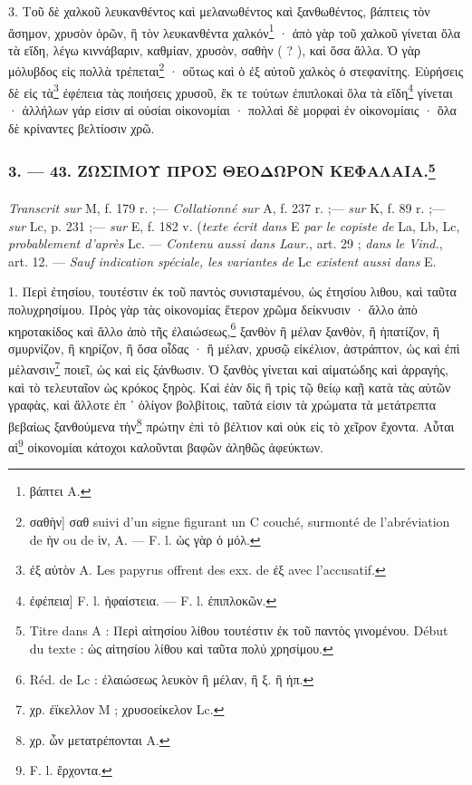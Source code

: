\documentclass[a4paper, 11pt, oneside, polutonikogreek, french]{article}
\begin{document}
3. Τοῦ δὲ χαλκοῦ λευκανθέντος καὶ μελανωθέντος καὶ ξανθωθέντος, βάπτεις τὸν ἄσημον, χρυσὸν ὁρῶν, ἢ τὸν λευκανθέντα χαλκόν\footnote{βάπτει A.} · ἀπὸ γὰρ τοῦ χαλκοῦ γίνεται ὅλα τὰ εἴδη, λέγω κιννάβαριν, καθμίαν, χρυσὸν, σαθὴν ( ? ), καὶ ὅσα ἄλλα. Ὁ γὰρ μόλυβδος εἰς πολλὰ τρέπεται\footnote{σαθὴν] σαθ suivi d'un signe figurant un C couché, surmonté de l'abréviation de ὴν ou de ὶν, A. --- F. l. ὡς γὰρ ὁ μόλ.} · οὕτως καὶ ὁ ἐξ αὐτοῦ χαλκὸς ὁ στεφανίτης. Εὑρήσεις δὲ εἰς τὰ\footnote{ἐξ αὐτὸν A. Les papyrus offrent des exx. de ἐξ avec l'accusatif.} ἐφέπεια τὰς ποιήσεις χρυσοῦ, ἔκ τε τούτων ἐπιπλοκαὶ ὅλα τὰ εἴδη\footnote{ἐφέπεια] F. l. ἡφαίστεια. --- F. l. ἐπιπλοκῶν.} γίνεται · ἀλλήλων γάρ εἰσιν αἱ οὐσίαι οἰκονομίαι · πολλαὶ δὲ μορφαὶ ἐν οἰκονομίαις · ὅλα δὲ κρίναντες βελτίοσιν χρῶ.

\bigskip
\centerline{\EightStarTaper}
\centerline{\EightStarTaper\EightStarTaper}
\bigskip

\subsubsection[3. --- 43. ΖΩΣΙΜΟΥ ΠΡΟΣ ΘΕΟΔΩΡΟΝ ΚΕΦΑΛΑΙΑ.]{3. --- 43. ΖΩΣΙΜΟΥ ΠΡΟΣ ΘΕΟΔΩΡΟΝ ΚΕΦΑΛΑΙΑ.\footnote{Titre dans A : Περὶ αἰτησίου λίθου τουτέστιν ἐκ τοῦ παντὸς γινομένου. Début du texte : ὡς αἰτησίου λίθου καὶ ταῦτα πολὐ χρησίμου.}}
\paragraph{}
\emph{Transcrit sur} M, f. 179 r. ;--- \emph{Collationné sur} A, f. 237 r. ;--- \emph{sur} K, f. 89 r. ;--- \emph{sur} Lc, p. 231 ;--- \emph{sur} E, f. 182 v. (\emph{texte écrit dans} E \emph{par le copiste de} La, Lb, Lc, \emph{probablement d'après} Lc. --- \emph{Contenu aussi dans Laur.}, art. 29 ; \emph{dans le Vind.}, art. 12. --- \emph{Sauf indication spéciale, les variantes de} Lc \emph{existent aussi dans} E.

\bigskip

1. Περὶ ἐτησίου, τουτέστιν ἐκ τοῦ παντὸς συνισταμένου, ὡς ἐτησίου λιθου, καὶ ταῦτα πολυχρησίμου. Πρὸς γὰρ τὰς οἱκονομίας ἕτερον χρῶμα δείκνυσιν · ἄλλο ἀπὸ κηροτακίδος καὶ ἄλλο ἀπὸ τῆς ἐλαιώσεως,\footnote{Réd. de Lc : ἐλαιώσεως λευκὸν ἢ μέλαν, ἢ ξ. ἢ ἡπ.} ξανθὸν ἢ μέλαν ξανθὸν, ἢ ἡπατίζον, ἢ σμυρνίζον, ἢ κηρίζον, ἢ ὅσα οἶδας · ἢ μέλαν, χρυσῷ εἰκέλιον, ἀστράπτον, ὡς καὶ ἐπὶ μέλανσιν\footnote{χρ. ἐϊκελλον M ; χρυσοείκελον Lc.} ποιεῖ, ὡς καὶ εἰς ξάνθωσιν. Ὁ ξανθὸς γίνεται καὶ αἱματώδης καὶ ἀρραγὴς, καὶ τὸ τελευταῖον ὡς κρόκος ξηρὸς. Καὶ ἐὰν δὶς ἢ τρὶς τῷ θείῳ καῇ κατὰ τὰς αὐτῶν γραφὰς, καὶ ἄλλοτε ἐπ ᾽ ὀλίγον βολβίτοις, ταῦτά εἰσιν τὰ χρώματα τὰ μετάτρεπτα βεβαίως ξανθούμενα τὴν\footnote{χρ. ὧν μετατρέπονται A.} πρώτην ἐπὶ τὸ βέλτιον καὶ οὐκ εἰς τὸ χεῖρον ἔχοντα. Αὗται αἱ\footnote{F. l. ἔρχοντα.} οἰκονομίαι κάτοχοι καλοῦνται βαφῶν ἀληθῶς ἀφεύκτων.
\end{document}
